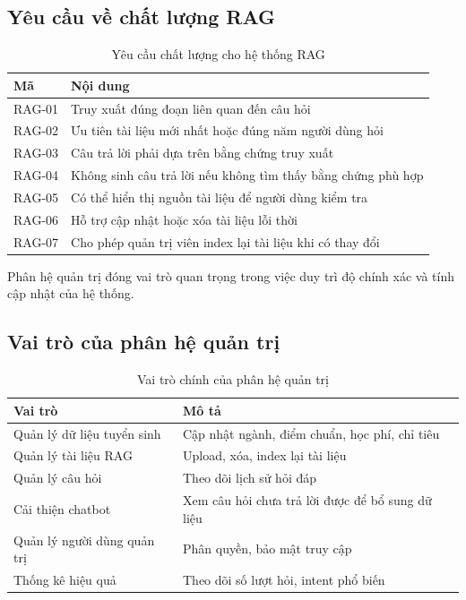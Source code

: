 \documentclass[12pt,a4paper]{report}
\begin{document}
\subsection{Yêu cầu về chất lượng RAG}
\begin{table}[H]
\centering
\caption{Yêu cầu chất lượng cho hệ thống RAG}
\label{tab:rag_quality}
\begin{tabular}{|p{2.2cm}|p{9.8cm}|}
\hline
\textbf{Mã} & \textbf{Nội dung} \\ \hline
RAG-01 & Truy xuất đúng đoạn liên quan đến câu hỏi \\ \hline
RAG-02 & Ưu tiên tài liệu mới nhất hoặc đúng năm người dùng hỏi \\ \hline
RAG-03 & Câu trả lời phải dựa trên bằng chứng truy xuất \\ \hline
RAG-04 & Không sinh câu trả lời nếu không tìm thấy bằng chứng phù hợp \\ \hline
RAG-05 & Có thể hiển thị nguồn tài liệu để người dùng kiểm tra \\ \hline
RAG-06 & Hỗ trợ cập nhật hoặc xóa tài liệu lỗi thời \\ \hline
RAG-07 & Cho phép quản trị viên index lại tài liệu khi có thay đổi \\ \hline
\end{tabular}
\end{table}


Phân hệ quản trị đóng vai trò quan trọng trong việc duy trì độ chính xác và tính cập nhật của hệ thống.

\subsection{Vai trò của phân hệ quản trị}
\begin{table}[H]
\centering
\caption{Vai trò chính của phân hệ quản trị}
\label{tab:admin_module_roles}
\begin{tabular}{|p{4cm}|p{8cm}|}
\hline
\textbf{Vai trò} & \textbf{Mô tả} \\ \hline
Quản lý dữ liệu tuyển sinh & Cập nhật ngành, điểm chuẩn, học phí, chỉ tiêu \\ \hline
Quản lý tài liệu RAG & Upload, xóa, index lại tài liệu \\ \hline
Quản lý câu hỏi & Theo dõi lịch sử hỏi đáp \\ \hline
Cải thiện chatbot & Xem câu hỏi chưa trả lời được để bổ sung dữ liệu \\ \hline
Quản lý người dùng quản trị & Phân quyền, bảo mật truy cập \\ \hline
Thống kê hiệu quả & Theo dõi số lượt hỏi, intent phổ biến \\ \hline
\end{tabular}
\end{table}
\end{document}
